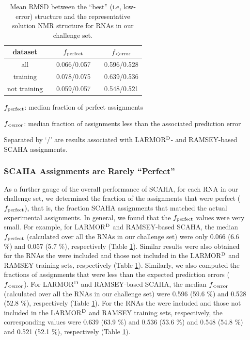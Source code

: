 \documentclass[journal=jcisd8,manuscript=article,layout=onecolumn]{achemso}
\begin{document}
\begin{table}[h!]
\centering
\caption{Mean RMSD between the ``best'' (i.e, low-error) structure and the representative solution NMR structure for RNAs in our challenge set.}
\begin{threeparttable}
\begin{tabular}{*5c}
\hline
dataset & {} & $f_{\rm perfect}$ & {} & $f_{\rm < error}$ \\
\hline
all & {}           & 0.066/0.057 & {} & 0.596/0.528 \\
training & {}      & 0.078/0.075 & {} & 0.639/0.536 \\
not training & {}  & 0.059/0.057 & {} & 0.548/0.521 \\
\hline
\end{tabular}
\begin{tablenotes}
\item[1]  $f_{\rm perfect}$: median fraction of perfect assignments
\item[2] $f_{\rm < error}$: median fraction of assignments less than the associated prediction error
\item[3] Separated by `/' are  results associated with LARMOR$^{\rm D}$- and RAMSEY-based SCAHA assignments.
\end{tablenotes}
\end{threeparttable}
\label{tab:fractions} 
\end{table}

\subsubsection{SCAHA Assignments are Rarely ``Perfect''} 
As a further gauge of the overall performance of SCAHA, for each RNA in our challenge set, we determined the fraction of the assignments that were perfect ($f_{\rm perfect}$), that is, the fraction SCAHA assignments that matched the actual experimental assignments. In general, we found that the $f_{\rm perfect}$ values were very small.  For example, for LARMOR$^{\rm D}$ and RAMSEY-based SCAHA, the median $f_{\rm perfect}$ (calculated over all the RNAs in our challenge set) were only 0.066 (6.6 \%) and 0.057 (5.7 \%), respectively  (Table \ref{tab:fractions}). Similar results were also obtained for the RNAs the were included and those not included in the LARMOR$^{\rm D}$ and RAMSEY training sets, respectively (Table \ref{tab:fractions}). Similarly, we also computed the fractions of assignments that were less than the expected prediction errors ($f_{\rm < error}$). For LARMOR$^{\rm D}$ and RAMSEY-based SCAHA, the median $f_{\rm < error}$ (calculated over all the RNAs in our challenge set) were 0.596 (59.6 \%) and 0.528 (52.8 \%), respectively  (Table \ref{tab:fractions}). For the RNAs the were included and those not included in the LARMOR$^{\rm D}$ and RAMSEY training sets, respectively, the corresponding values were 0.639 (63.9 \%) and 0.536 (53.6 \%) and 0.548 (54.8 \%) and 0.521 (52.1 \%), respectively (Table \ref{tab:fractions}). 
\end{document}
